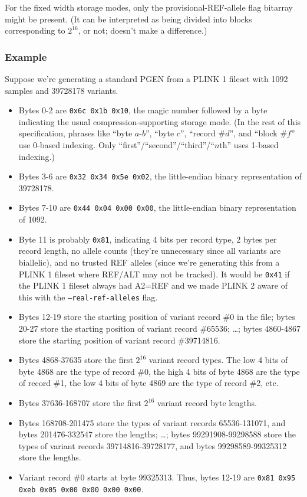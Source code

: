 \documentclass[8pt]{article}
\begin{document}
For the fixed width storage modes, only the provisional-REF-allele flag
bitarray might be present.  (It can be interpreted as being divided into blocks
corresponding to $2^{16}$, or not; doesn't make a difference.)

\subsubsection{Example}

Suppose we're generating a standard PGEN from a PLINK 1 fileset with 1092
samples and 39728178 variants.

\begin{itemize}
\item Bytes 0-2 are \texttt{0x6c 0x1b 0x10}, the magic number followed by a
  byte indicating the usual compression-supporting storage mode.  (In the rest
  of this specification, phrases like ``byte $a$-$b$'', ``byte $c$'', ``record
  \#$d$'', and ``block \#$f$'' use 0-based indexing.  Only
  ``first''/``second''/``third''/``$n$th'' uses 1-based indexing.)
\item Bytes 3-6 are \texttt{0x32 0x34 0x5e 0x02}, the little-endian binary
  representation of 39728178.
\item Bytes 7-10 are \texttt{0x44 0x04 0x00 0x00}, the little-endian binary
  representation of 1092.
\item Byte 11 is probably \texttt{0x81}, indicating 4 bits per record type, 2
  bytes per record length, no allele counts (they're unnecessary since all
  variants are biallelic), and no trusted REF alleles (since we're generating
  this from a PLINK 1 fileset where REF/ALT may not be tracked).  It would be
  \texttt{0x41} if the PLINK 1 fileset always had A2=REF and we made PLINK 2
  aware of this with the \texttt{--real-ref-alleles} flag.
\item Bytes 12-19 store the starting position of variant record \#0 in the
  file; bytes 20-27 store the starting position of variant record \#65536;
  \ldots ; bytes 4860-4867 store the starting position of variant record
  \#39714816.
\item Bytes 4868-37635 store the first $2^{16}$ variant record types.  The low
  4 bits of byte 4868 are the type of record \#0, the high 4 bits of byte 4868
  are the type of record \#1, the low 4 bits of byte 4869 are the type of
  record \#2, etc.
\item Bytes 37636-168707 store the first $2^{16}$ variant record byte lengths.
\item Bytes 168708-201475 store the types of variant records 65536-131071, and
  bytes 201476-332547 store the lengths; \ldots ; bytes 99291908-99298588 store
  the types of variant records 39714816-39728177, and bytes 99298589-99325312
  store the lengths.
\item Variant record \#0 starts at byte 99325313.  Thus, bytes 12-19 are
  \texttt{0x81 0x95 0xeb 0x05 0x00 0x00 0x00 0x00}.
\end{itemize}
\end{document}
